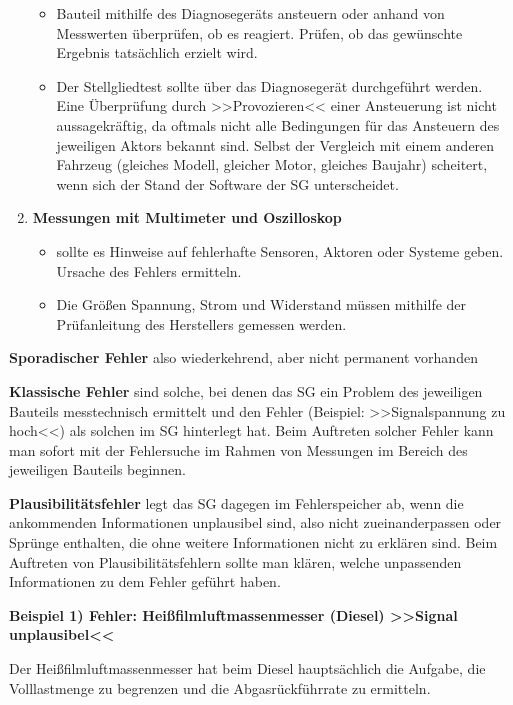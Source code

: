 \begin{enumerate}
  \begin{itemize}
  \item
    Bauteil mithilfe des Diagnosegeräts ansteuern oder anhand von
    Messwerten überprüfen, ob es reagiert. Prüfen, ob das gewünschte
    Ergebnis tatsächlich erzielt wird.
  \item
    Der Stellgliedtest sollte über das Diagnosegerät durchgeführt
    werden. Eine Überprüfung durch >>Provozieren<< einer Ansteuerung ist
    nicht aussagekräftig, da oftmals nicht alle Bedingungen für das
    Ansteuern des jeweiligen Aktors bekannt sind. Selbst der Vergleich
    mit einem anderen Fahrzeug (gleiches Modell, gleicher Motor,
    gleiches Baujahr) scheitert, wenn sich der Stand der Software der SG
    unterscheidet.
  \end{itemize}
\item
  \textbf{Messungen mit Multimeter und Oszilloskop}

  \begin{itemize}
  \item
    sollte es Hinweise auf fehlerhafte Sensoren, Aktoren oder Systeme
    geben. Ursache des Fehlers ermitteln.
  \item
    Die Größen Spannung, Strom und Widerstand müssen mithilfe der
    Prüfanleitung des Herstellers gemessen werden.
  \end{itemize}
\end{enumerate}

\textbf{Sporadischer Fehler} also wiederkehrend, aber nicht permanent
vorhanden

\textbf{Klassische Fehler} sind solche, bei denen das SG ein Problem des
jeweiligen Bauteils messtechnisch ermittelt und den Fehler (Beispiel:
>>Signalspannung zu hoch<<) als solchen im SG hinterlegt hat. Beim
Auftreten solcher Fehler kann man sofort mit der Fehlersuche im Rahmen
von Messungen im Bereich des jeweiligen Bauteils beginnen.

\textbf{Plausibilitätsfehler} legt das SG dagegen im Fehlerspeicher ab,
wenn die ankommenden Informationen unplausibel sind, also nicht
zueinanderpassen oder Sprünge enthalten, die ohne weitere Informationen
nicht zu erklären sind. Beim Auftreten von Plausibilitätsfehlern sollte
man klären, welche unpassenden Informationen zu dem Fehler geführt
haben.

\textbf{Beispiel 1) Fehler: Heißfilmluftmassenmesser (Diesel) >>Signal
unplausibel<<}

Der Heißfilmluftmassenmesser hat beim Diesel hauptsächlich die Aufgabe,
die Volllastmenge zu begrenzen und die Abgasrückführrate zu ermitteln.

